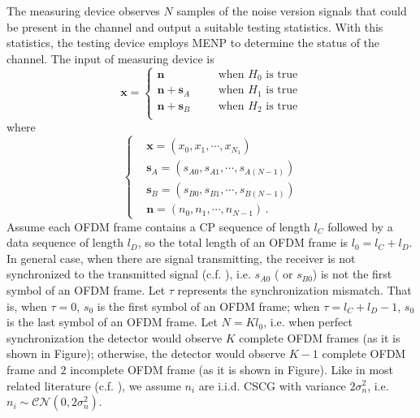 The measuring device observes $N$ samples of the noise version signals that could be present in the channel and output a suitable testing statistics. With this statistics, the testing device employs MENP to determine the status of the channel. The input of measuring device is
\begin{equation}
  \mathbf{x} = \begin{cases}
	\mathbf{n}\;\;\;\;\;\;&\text{when $H_0$ is true}\\
	\mathbf{n}+\mathbf{s}_A\;\;\;\;\;\;&\text{when $H_1$ is true}\\
	\mathbf{n}+\mathbf{s}_B\;\;\;\;\;\;&\text{when $H_2$ is true}\\
  \end{cases}
  \label{equ:1209a1}
\end{equation}
where 
\begin{equation}
  \begin{cases}
	&\mathbf{x} = (x_0, x_1, \cdots, x_{N_1})\\
	&\mathbf{s}_A = (s_{A0}, s_{A1}, \cdots, s_{A(N-1)})\\
	&\mathbf{s}_B = (s_{B0}, s_{B1}, \cdots, s_{B(N-1)})\\
	&\mathbf{n} = (n_{0}, n_{1}, \cdots, n_{N-1})\,.
  \end{cases}
  \label{xssn}
\end{equation}
Assume each OFDM frame contains a CP sequence of length $l_C$ followed by a data sequence of length $l_D$, so the total length of an OFDM frame is $l_0 = l_C+l_D$. In general case, when there are signal transmitting, the receiver is not synchronized to the transmitted signal (c.f. ), i.e. $s_{A0}$ ( or $s_{B0}$) is not the first symbol of an OFDM frame. Let $\tau$ represents the synchronization mismatch. That is, when $\tau = 0$, $s_0$ is the first symbol of an OFDM frame; when $\tau = l_C+l_D -1$, $s_0$ is the last symbol of an OFDM frame. Let $N = Kl_0$, i.e. when perfect synchronization the detector would observe $K$ complete  OFDM frames (as it is shown in Figure); otherwise, the detector would observe $K-1$ complete OFDM frame and $2$ incomplete OFDM frame (as it is shown in Figure). Like in most related literature (c.f. ), we assume  $n_i$ are i.i.d. CSCG with variance $2\sigma_n^2$, i.e. $n_i \sim \mathcal{CN}(0, 2\sigma_n^2)$. 

